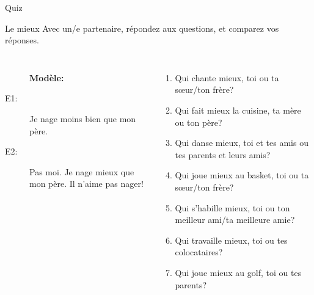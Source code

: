 \documentclass{beamer}
\begin{document}
  \begin{frame}{}
    \begin{center}
      \Large Quiz
    \end{center}
  \end{frame}

  \begin{frame}{Le mieux}
    Avec un/e partenaire, répondez aux questions, et comparez vos réponses. \\
    \begin{columns}
      \scriptsize
        \begin{description}
          \item[] \textbf{Modèle:}
          \item[] 
          \item[E1:] Je nage moins bien que mon père.
          \item[E2:] Pas moi. Je nage mieux que mon père. Il n'aime pas nager!
        \end{description}
        \begin{enumerate}
          \item Qui chante mieux, toi ou ta sœur/ton frère?
          \item Qui fait mieux la cuisine, ta mère ou ton père?
          \item Qui danse mieux, toi et tes amis ou tes parents et leurs amis?
          \item Qui joue mieux au basket, toi ou ta sœur/ton frère?
          \item Qui s'habille mieux, toi ou ton meilleur ami/ta meilleure amie?
          \item Qui travaille mieux, toi ou tes colocataires?
          \item Qui joue mieux au golf, toi ou tes parents?
        \end{enumerate}
    \end{columns}
  \end{frame}
\end{document}
